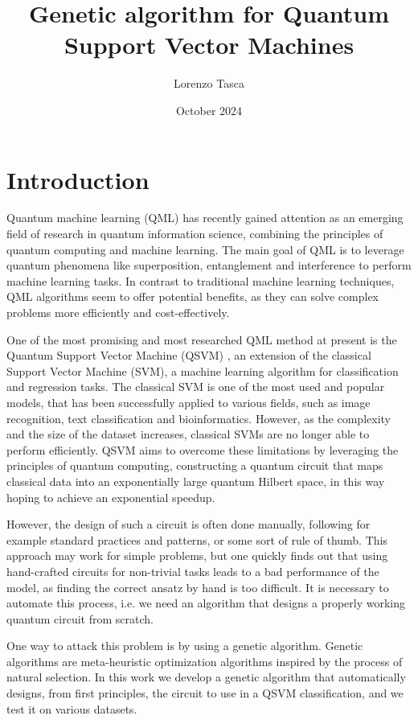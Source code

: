 \documentclass[12pt]{article}
\title{Genetic algorithm for Quantum Support Vector Machines}
\author{Lorenzo Tasca}
\date{October 2024}
\begin{document}
\tableofcontents

\newpage


\section{Introduction}

Quantum machine learning (QML) has recently gained attention as an emerging field of research in quantum information science, combining the principles of quantum computing and machine learning. \cite{biamonte2017} The main goal of QML is to leverage quantum phenomena like superposition, entanglement and interference to perform machine learning tasks. In contrast to traditional machine learning techniques, QML algorithms seem to offer potential benefits, as they can solve complex problems more efficiently and cost-effectively.

One of the most promising and most researched QML method at present is the Quantum Support Vector Machine (QSVM) \cite{havlicek2019} \cite{schuld2018}, an extension of the classical Support Vector Machine (SVM), a machine learning algorithm for classification and regression tasks. The classical SVM is one of the most used and popular models, that has been successfully applied to various fields, such as image recognition, text classification and bioinformatics. \cite{cristianini2000} However, as the complexity and the size of the dataset increases, classical SVMs are no longer able to perform efficiently. QSVM aims to overcome these limitations by leveraging the principles of quantum computing, constructing a quantum circuit that maps classical data into an exponentially large quantum Hilbert space, in this way hoping to achieve an exponential speedup. 

However, the design of such a circuit is often done manually, following for example standard practices and patterns, or some sort of rule of thumb. This approach may work for simple problems, but one quickly finds out that using hand-crafted circuits for non-trivial tasks leads to a bad performance of the model, as finding the correct ansatz by hand is too difficult. It is necessary to automate this process, i.e. we need an algorithm that designs a properly working quantum circuit from scratch. 

One way to attack this problem is by using a genetic algorithm. Genetic algorithms are meta-heuristic optimization algorithms inspired by the process of natural selection. In this work we develop a genetic algorithm that automatically designs, from first principles, the circuit to use in a QSVM classification, and we test it on various datasets. 
\end{document}
